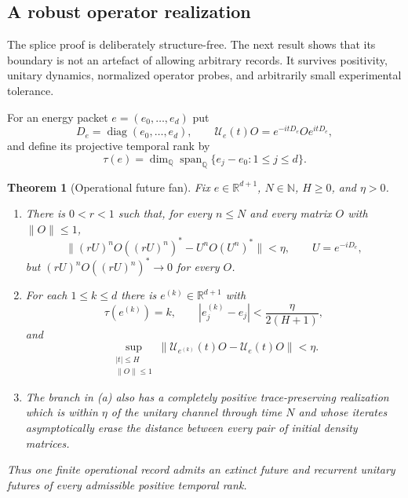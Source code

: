 \documentclass[11pt]{article}
\newtheorem{theorem}{Theorem}[section]
\theoremstyle{definition}
\theoremstyle{remark}
\newcommand{\R}{\mathbb R}
\newcommand{\N}{\mathbb N}
\begin{document}
\subsection{A robust operator realization}

The splice proof is deliberately structure-free.  The next result shows that its boundary is not
an artefact of allowing arbitrary records.  It survives positivity, unitary dynamics, normalized
operator probes, and arbitrarily small experimental tolerance.

For an energy packet $e=(e_0,\ldots,e_d)$ put
\[
 D_e=\operatorname{diag}(e_0,\ldots,e_d),\qquad
 \mathcal U_e(t)O=e^{-itD_e}Oe^{itD_e},
\]
and define its projective temporal rank by
\[
 \tau(e)=\dim_{\mathbb Q}\operatorname{span}_{\mathbb Q}
          \{e_j-e_0:1\le j\le d\}.
\]

\begin{theorem}[Operational future fan]
\label{thm:operational-future-fan}
Fix $e\in\R^{d+1}$, $N\in\N$, $H\ge0$, and $\eta>0$.
\begin{enumerate}[label=\textup{(\alph*)}]
\item There is $0<r<1$ such that, for every $n\le N$ and every matrix $O$ with $\|O\|\le1$,
\[
 \bigl\|(rU)^nO((rU)^n)^*-U^nO(U^n)^*\bigr\|<\eta,
 \qquad U=e^{-iD_e},
 \tag{2.3}\label{eq:radial-finite-record}
\]
but $(rU)^nO((rU)^n)^*\to0$ for every $O$.
\item For each $1\le k\le d$ there is $e^{(k)}\in\R^{d+1}$ with
\[
 \tau(e^{(k)})=k,\qquad
 |e^{(k)}_j-e_j|<\frac{\eta}{2(H+1)},
 \tag{2.4}\label{eq:angular-rank}
\]
and
\[
 \sup_{\substack{|t|\le H\\ \|O\|\le1}}
 \|\mathcal U_{e^{(k)}}(t)O-\mathcal U_e(t)O\|<\eta.
 \tag{2.5}\label{eq:angular-finite-record}
\]
\item The branch in \textup{(a)} also has a completely positive trace-preserving realization
which is within $\eta$ of the unitary channel through time $N$ and whose iterates asymptotically
erase the distance between every pair of initial density matrices.
\end{enumerate}
Thus one finite operational record admits an extinct future and recurrent unitary futures of
every admissible positive temporal rank.
\end{theorem}
\end{document}
